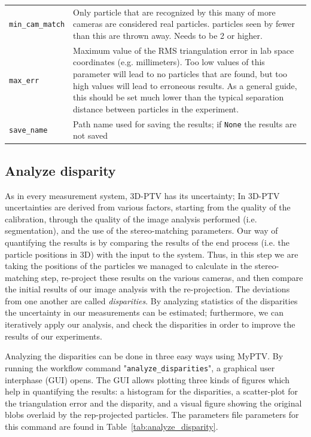 \documentclass[10pt,a4paper]{article}
\begin{document}
\begin{table}[!ht]
\begin{tabular}{l m{13cm}}
		\texttt{min\_cam\_match} & Only particle that are recognized by this many of more cameras are considered real particles. particles seen by fewer than this are thrown away. Needs to be 2 or higher. \\[.1cm]
		
		\texttt{max\_err} & Maximum value of the RMS triangulation error in lab space coordinates (e.g. millimeters). Too low values of this parameter will lead to no particles that are found, but too high values will lead to erroneous results. As a general guide, this should be set much lower than the typical separation distance between particles in the experiment.  \\[.1cm]
		
		\texttt{save\_name} & Path name used for saving the results; if \texttt{None} the results are not saved \\[.1cm]
		
		\hline
	\end{tabular}
\end{table}







\subsection{Analyze disparity}\label{sec:workflow_analyze_disparity}


As in every measurement system, 3D-PTV has its uncertainty; In 3D-PTV uncertainties are derived from various factors, starting from the quality of the calibration, through the quality of the image analysis performed (i.e. segmentation), and the use of the stereo-matching parameters. Our way of quantifying the results is by comparing the results of the end process (i.e. the particle positions in 3D) with the input to the system. Thus, in this step we are taking the positions of the particles we managed to calculate in the stereo-matching step, re-project these results on the various cameras, and then compare the initial results of our image analysis with the re-projection. The deviations from one another are called \textit{disparities}.
By analyzing statistics of the disparities the uncertainty in our measurements can be estimated; furthermore, we can iteratively apply our analysis, and check the disparities in order to improve the results of our experiments.

Analyzing the disparities can be done in three easy ways using MyPTV. By running the workflow command "\texttt{analyze\_disparities}", a graphical user interphase (GUI) opens. The GUI allows plotting three kinds of figures which help in quantifying the results: a histogram for the disparities, a scatter-plot for the triangulation error and the disparity, and a visual figure showing the original blobs overlaid by the rep-projected particles. The parameters file parameters for this command are found in Table~\ref{tab:analyze_disparity}. 
\end{document}
